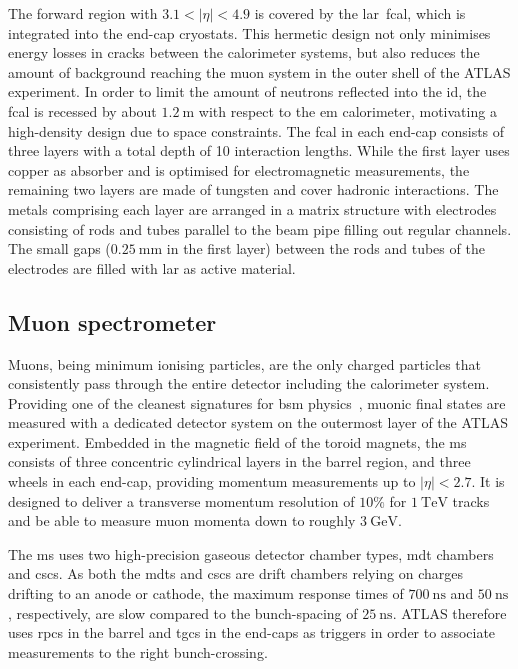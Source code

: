The forward region with $3.1 < \vert\eta\vert <4.9$ is covered by the \gls{lar}~\gls{fcal}, which is integrated into the end-cap cryostats. This hermetic design not only minimises energy losses in cracks between the calorimeter systems, but also reduces the amount of background reaching the muon system in the outer shell of the ATLAS experiment. In order to limit the amount of neutrons reflected into the \gls{id}, the \gls{fcal} is recessed by about $\SI{1.2}{\meter}$ with respect to the \gls{em} calorimeter, motivating a high-density design due to space constraints. The \gls{fcal} in each end-cap consists of three layers with a total depth of 10 interaction lengths. While the first layer uses copper as absorber and is optimised for electromagnetic measurements, the remaining two layers are made of tungsten and cover hadronic interactions. The metals comprising each layer are arranged in a matrix structure with electrodes consisting of rods and tubes parallel to the beam pipe filling out regular channels. The small gaps ($\SI{0.25}{\milli\meter}$ in the first layer) between the rods and tubes of the electrodes are filled with \gls{lar} as active material.

\subsection{Muon spectrometer}

Muons, being minimum ionising particles, are the only charged particles that consistently pass through the entire detector including the calorimeter system. Providing one of the cleanest signatures for \gls{bsm} physics~\cite{Brock:1354959}, muonic final states are measured with a dedicated detector system on the outermost layer of the ATLAS experiment. Embedded in the magnetic field of the toroid magnets, the \gls{ms} consists of three concentric cylindrical layers in the barrel region, and three wheels in each end-cap, providing momentum measurements up to $\vert\eta\vert <2.7$. It is designed to deliver a transverse momentum resolution of $10\%$ for $\SI{1}{\TeV}$ tracks and be able to measure muon momenta down to roughly $\SI{3}{\GeV}$.

The \gls{ms} uses two high-precision gaseous detector chamber types, \gls{mdt} chambers and \glspl{csc}. As both the \glspl{mdt} and \glspl{csc} are drift chambers relying on charges drifting to an anode or cathode, the maximum response times of $\SI{700}{\nano\second}$ and $\SI{50}{\nano\second}$, respectively, are slow compared to the bunch-spacing of $\SI{25}{\nano\second}$. ATLAS therefore uses \glspl{rpc} in the barrel and \glspl{tgc} in the end-caps as triggers in order to associate measurements to the right bunch-crossing.  

